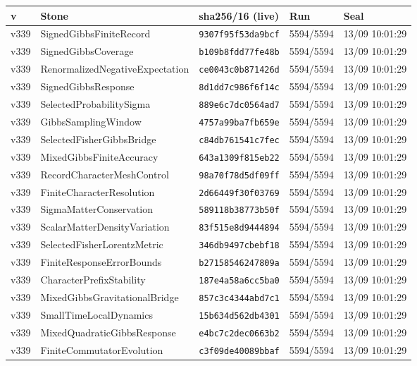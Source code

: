 \documentclass[11pt]{article}
\theoremstyle{definition}\newtheorem{deriv}{Derivation}
\begin{document}
{\small\begin{longtable}{@{}lllll@{}}\toprule v & Stone & sha256/16 (live) & Run & Seal \\ \midrule\endhead 
v339 & SignedGibbsFiniteRecord & \texttt{9307f95f53da9bcf} & 5594/5594 & 13/09 10:01:29 \\
v339 & SignedGibbsCoverage & \texttt{b109b8fdd77fe48b} & 5594/5594 & 13/09 10:01:29 \\
v339 & RenormalizedNegativeExpectation & \texttt{ce0043c0b871426d} & 5594/5594 & 13/09 10:01:29 \\
v339 & SignedGibbsResponse & \texttt{8d1dd7c986f6f14c} & 5594/5594 & 13/09 10:01:29 \\
v339 & SelectedProbabilitySigma & \texttt{889e6c7dc0564ad7} & 5594/5594 & 13/09 10:01:29 \\
v339 & GibbsSamplingWindow & \texttt{4757a99ba7fb659e} & 5594/5594 & 13/09 10:01:29 \\
v339 & SelectedFisherGibbsBridge & \texttt{c84db761541c7fec} & 5594/5594 & 13/09 10:01:29 \\
v339 & MixedGibbsFiniteAccuracy & \texttt{643a1309f815eb22} & 5594/5594 & 13/09 10:01:29 \\
v339 & RecordCharacterMeshControl & \texttt{98a70f78d5df09ff} & 5594/5594 & 13/09 10:01:29 \\
v339 & FiniteCharacterResolution & \texttt{2d66449f30f03769} & 5594/5594 & 13/09 10:01:29 \\
v339 & SigmaMatterConservation & \texttt{589118b38773b50f} & 5594/5594 & 13/09 10:01:29 \\
v339 & ScalarMatterDensityVariation & \texttt{83f515e8d9444894} & 5594/5594 & 13/09 10:01:29 \\
v339 & SelectedFisherLorentzMetric & \texttt{346db9497cbebf18} & 5594/5594 & 13/09 10:01:29 \\
v339 & FiniteResponseErrorBounds & \texttt{b27158546247809a} & 5594/5594 & 13/09 10:01:29 \\
v339 & CharacterPrefixStability & \texttt{187e4a58a6cc5ba0} & 5594/5594 & 13/09 10:01:29 \\
v339 & MixedGibbsGravitationalBridge & \texttt{857c3c4344abd7c1} & 5594/5594 & 13/09 10:01:29 \\
v339 & SmallTimeLocalDynamics & \texttt{15b634d562db4301} & 5594/5594 & 13/09 10:01:29 \\
v339 & MixedQuadraticGibbsResponse & \texttt{e4bc7c2dec0663b2} & 5594/5594 & 13/09 10:01:29 \\
v339 & FiniteCommutatorEvolution & \texttt{c3f09de40089bbaf} & 5594/5594 & 13/09 10:01:29 \\

\end{longtable}}
\end{document}
